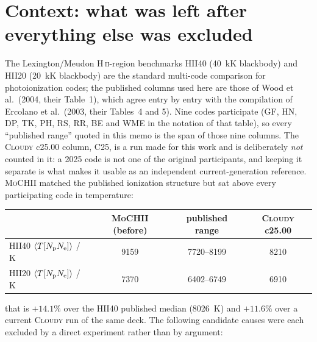 \documentclass[english,a4paper]{my_memo}
\newcommand{\MoCHII}{\textsc{MoCHII}}
\newcommand{\Cloudy}{\textsc{Cloudy}}
\newcommand{\HII}{H\,\textsc{ii}}
\begin{document}
\section{Context: what was left after everything else was excluded}
\label{sec:context}

The Lexington/Meudon \HII{}-region benchmarks HII40 (40~kK blackbody) and
HII20 (20~kK blackbody) are the standard multi-code comparison for
photoionization codes; the published columns used here are those of Wood
et al.\ (2004, their Table~1), which agree entry by entry with the compilation
of Ercolano et al.\ (2003, their Tables~4 and 5).  Nine codes participate
(GF, HN, DP, TK, PH, RS, RR, BE and WME in the notation of that table), so
every ``published range'' quoted in this memo is the span of those nine
columns.  The \Cloudy{} c25.00 column, C25, is a run made for this work and is
deliberately \emph{not} counted in it: a 2025 code is not one of the original
participants, and keeping it separate is what makes it usable as an
independent current-generation reference.  \MoCHII{} matched the published
ionization structure but sat above every participating code in temperature:

\begin{center}
\begin{tabular}{lccc}
\toprule
 & \MoCHII{} (before) & published range & \Cloudy{} c25.00 \\
\midrule
HII40 $\langle T[N_{\rm p}N_{\rm e}]\rangle$ / K & 9159 & 7720--8199 & 8210 \\
HII20 $\langle T[N_{\rm p}N_{\rm e}]\rangle$ / K & 7370 & 6402--6749 & 6910 \\
\bottomrule
\end{tabular}
\end{center}

\noindent
that is $+14.1\%$ over the HII40 published median (8026~K) and $+11.6\%$ over
a current \Cloudy{} run of the same deck.  The following candidate causes were
each excluded by a direct experiment rather than by argument:
\end{document}
